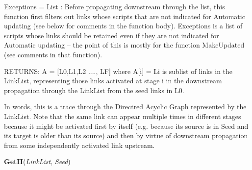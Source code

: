 \begin{boxedminipage}{\funcwidth}
    Exceptions = List : Before propagating downstream through the list, 
    this function first filters out links whose scripts that are not 
    indicated for Automatic updating (see below for comments in the 
    function body). Exceptions is a list of scripts whose links should be 
    retained even if they are not indicated for Automatic updating -- the 
    point of this is mostly for the function MakeUpdated (see comments in 
    that function).

    RETURNS: A = [L0,L1,L2 ...., LF] where A[i]  = Li is sublist of links 
    in the LinkList, representing those links activated at stage i in the 
    downstream propagation through the LinkList from the seed links in L0.

    In words, this is a trace through the Directred Acyclic Graph 
    represented by the LinkList. Note that the same link can appear 
    multiple times in different stages because it might be activated first 
    by itself (e.g. because its source is in Seed and its target is older 
    than its source) and then by virtue of downstream propagation from some
    independently activated link upstream.

\setlength{\parskip}{1ex}
    \end{boxedminipage}

    \label{System:LinkManagement:GetII}

    \vspace{0.5ex}

\hspace{.8\funcindent}\begin{boxedminipage}{\funcwidth}

    \raggedright \textbf{GetII}(\textit{LinkList}, \textit{Seed})

\setlength{\parskip}{2ex}
\setlength{\parskip}{1ex}
    \end{boxedminipage}

    \label{System:LinkManagement:UpdateGuts}

    \vspace{0.5ex}

